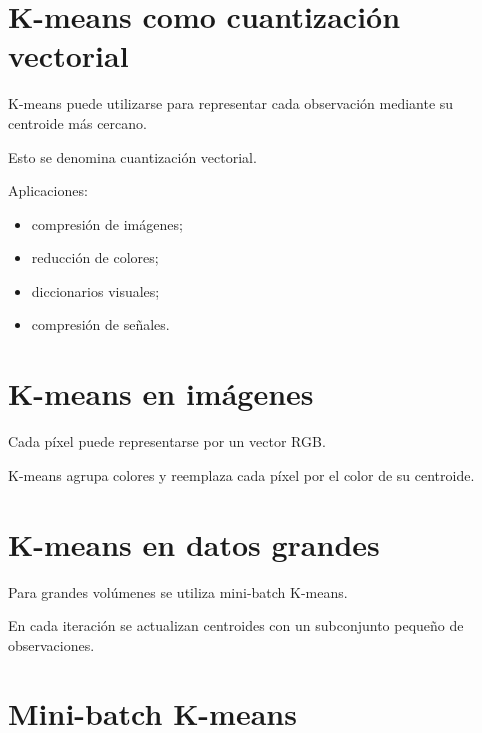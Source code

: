 \documentclass[
  spanish,
  10.5pt,
  letterpaper,
  DIV=11,
  numbers=noendperiod,
  oneside,
  open=any]{scrreprt}
\providecommand{\tightlist}{%
  \setlength{\itemsep}{0pt}\setlength{\parskip}{0pt}}
\theoremstyle{definition}
\theoremstyle{definition}
\theoremstyle{plain}
\theoremstyle{remark}
\begin{document}
\section*{K-means como cuantización
vectorial}\label{k-means-como-cuantizaciuxf3n-vectorial}


K-means puede utilizarse para representar cada observación mediante su
centroide más cercano.

Esto se denomina cuantización vectorial.

Aplicaciones:

\begin{itemize}
\tightlist
\item
  compresión de imágenes;
\item
  reducción de colores;
\item
  diccionarios visuales;
\item
  compresión de señales.
\end{itemize}

\section*{K-means en imágenes}\label{k-means-en-imuxe1genes}


Cada píxel puede representarse por un vector RGB.

K-means agrupa colores y reemplaza cada píxel por el color de su
centroide.

\section*{K-means en datos grandes}\label{k-means-en-datos-grandes}


Para grandes volúmenes se utiliza mini-batch K-means.

En cada iteración se actualizan centroides con un subconjunto pequeño de
observaciones.

\section*{Mini-batch K-means}\label{mini-batch-k-means}
\end{document}
